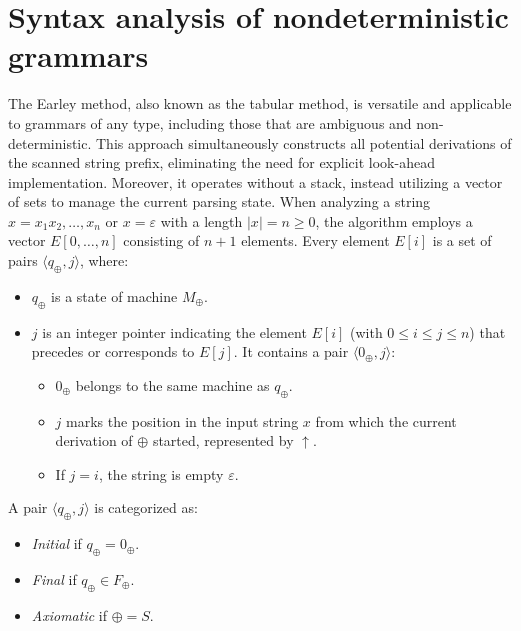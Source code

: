 \section{Syntax analysis of nondeterministic grammars}

The Earley method, also known as the tabular method, is versatile and applicable to grammars of any type, including those that are ambiguous and non-deterministic. 
This approach simultaneously constructs all potential derivations of the scanned string prefix, eliminating the need for explicit look-ahead implementation.
Moreover, it operates without a stack, instead utilizing a vector of sets to manage the current parsing state.
When analyzing a string $x = x_1 x_2, \dots, x_n$ or $x = \varepsilon$ with a length $|x| = n \geq 0$, the algorithm employs a vector $E\left[ 0, \dots, n \right]$ consisting of $n+1$ elements.
Every element $E[i]$ is a set of pairs $\langle q_\oplus, j\rangle$, where:
\begin{itemize}
    \item $q_\oplus$ is a state of machine $M_\oplus$. 
    \item $j$ is an integer pointer indicating the element $E[i]$ (with $0 \leq i \leq j \leq n$) that precedes or corresponds to $E[j]$. 
        It contains a pair $\langle 0_\oplus, j \rangle$: 
        \begin{itemize}
            \item $0_\oplus$ belongs to the same machine as $q_\oplus$.
            \item $j$ marks the position in the input string $x$ from which the current derivation of $\oplus$ started, represented by $\uparrow$. 
            \item If $j = i$, the string is empty $\varepsilon$. 
        \end{itemize}
\end{itemize}
A pair $\langle q_\oplus, j \rangle$ is categorized as:
\begin{itemize}
    \item \textit{Initial} if $q_\oplus = 0_\oplus$.
    \item \textit{Final} if $q_\oplus \in F_\oplus$.
    \item \textit{Axiomatic} if $\oplus = S$.
\end{itemize}

